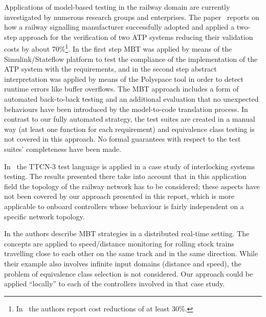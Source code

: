 Applications of model-based testing in the railway domain are currently investigated by numerous research groups and enterprises. 
The paper~\cite{ferrari2011adoption} reports on how a railway signalling manufacturer successfully adopted and applied a two-step approach for the verification of two ATP systems reducing their validation costs by about 
70\%\footnote{In~\cite{peleska2009d} the authors report cost reductions of at least 30\%.}. In the first step MBT was applied by means of the Simulink/Stateflow    platform to test the compliance of the implementation of the ATP
        system with the requirements, and in the second step abstract interpretation was applied  by means of the Polyspace tool in order to detect runtime errors
        like buffer overflows. The MBT approach includes a form of automated back-to-back testing and an additional evaluation that no unexpected behaviours have been introduced by the model-to-code translation process. In contrast to our fully automated strategy, the test suites are   created in a manual way (at least one function for each requirement) and equivalence class testing is not covered in this approach. No formal guarantees with respect to the test suites' completeness  have been made.

In~\cite{calame2006ttcn} the TTCN-3 test language is applied in a case study of interlocking systems testing. The results presented there take into account that in this application field the topology of the railway network has to be considered; these aspects have not been covered by our approach presented in this report, which is more applicable to onboard controllers whose behaviour is fairly independent on a specific network topology.

In
\cite{hieronsICTSS13} the authors describe MBT strategies in a distributed real-time setting. The concepts are applied to speed/distance monitoring for rolling stock trains travelling close to each other on the same track and in the same direction. While their example also involves infinite input domains (distance and speed), the problem of equivalence class selection is not considered. Our approach could be applied ``locally'' to each of the controllers involved in that case study.







